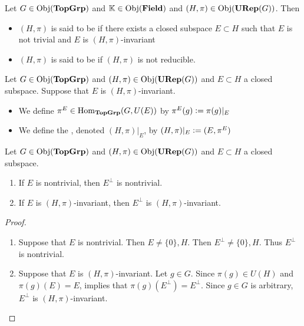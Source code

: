 \documentclass{book}
\begin{document}
	\begin{defn}
		Let $G \in \operatorname{Obj}(\operatorname*{\text{\textbf{TopGrp}}})$ and $\mathbb{K} \in \operatorname{Obj}(\operatorname*{\text{\textbf{Field}}})$ and $(H, \pi) \in \operatorname{Obj}(\operatorname*{\text{\textbf{URep}}}(G))$. Then 
		\begin{itemize}
			\item $(H, \pi)$ is said to be  if there exists a closed subspace $E \subset H$ such that $E$ is not trivial and $E$ is $(H, \pi)$-invariant 
			\item $(H, \pi)$ is said to be  if $(H, \pi)$ is not reducible.
		\end{itemize}
	\end{defn}

	\begin{defn}
		Let $G \in \operatorname{Obj}(\operatorname*{\text{\textbf{TopGrp}}})$ and $(H, \pi) \in \operatorname{Obj}(\operatorname*{\text{\textbf{URep}}}(G))$ and $E \subset H$ a closed subspace. Suppose that $E$ is $(H, \pi)$-invariant. 
		\begin{itemize}
			\item We define $\pi^E \in \operatorname{Hom}_{\operatorname*{\text{\textbf{TopGrp}}}}(G, U(E))$ by $\pi^E(g) \vcentcolon= \pi(g)|_E$
			\item We define the , denoted $(H, \pi)|_E$, by $(H, \pi)|_E \vcentcolon= (E, \pi^E)$
		\end{itemize}
	\end{defn}

	\begin{ex}
		Let $G \in \operatorname{Obj}(\operatorname*{\text{\textbf{TopGrp}}})$ and $(H, \pi) \in \operatorname{Obj}(\operatorname*{\text{\textbf{URep}}}(G))$ and $E \subset H$ a closed subspace. 
		\begin{enumerate}
			\item If $E$ is nontrivial, then $E^{\perp}$ is nontrivial.
			\item If $E$ is $(H, \pi)$-invariant, then $E^{\perp}$ is  $(H, \pi)$-invariant.  
		\end{enumerate}
	\end{ex}
	
	\begin{proof}\
		\begin{enumerate}
			\item Suppose that $E$ is nontrivial. Then $E \neq \{0\}, H$. Then $E^{\perp} \neq \{0\}, H$. Thus $E^{\perp}$ is nontrivial.
			\item Suppose that $E$ is $(H, \pi)$-invariant. Let $g \in G$. Since $\pi(g) \in U(H)$ and $\pi(g)(E) = E$,  implies that $\pi(g)(E^{\perp}) = E^{\perp}$. Since $g \in G$ is arbitrary, $E^{\perp}$ is $(H, \pi)$-invariant. 
		\end{enumerate}
	\end{proof}
\end{document}

